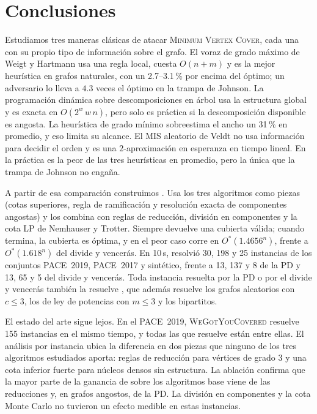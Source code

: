 \section{Conclusiones}\label{sec:conclusiones}

Estudiamos tres maneras clásicas de atacar \textsc{Minimum Vertex Cover}, cada una con su propio tipo de información sobre el grafo. El voraz de grado máximo de Weigt y Hartmann usa una regla local, cuesta $O(n+m)$ y es la mejor heurística en grafos naturales, con un 2.7--3.1\,\% por encima del óptimo; un adversario lo lleva a $4.3$ veces el óptimo en la trampa de Johnson. La programación dinámica sobre descomposiciones en árbol usa la estructura global y es exacta en $O(2^w\,w\,n)$, pero solo es práctica si la descomposición disponible es angosta. La heurística de grado mínimo sobreestima el ancho un 31\,\% en promedio, y eso limita su alcance. El MIS aleatorio de Veldt no usa información para decidir el orden y es una $2$-aproximación en esperanza en tiempo lineal. En la práctica es la peor de las tres heurísticas en promedio, pero la única que la trampa de Johnson no engaña.

A partir de esa comparación construimos \hyvc. Usa los tres algoritmos como piezas (cotas superiores, regla de ramificación y resolución exacta de componentes angostas) y los combina con reglas de reducción, división en componentes y la cota LP de Nemhauser y Trotter. Siempre devuelve una cubierta válida; cuando termina, la cubierta es óptima, y en el peor caso corre en $O^*(1.4656^n)$, frente a $O^*(1.618^n)$ del divide y vencerás. En 10\,s, \hyvc{} resolvió 30, 198 y 25 instancias de los conjuntos PACE~2019, PACE~2017 y sintético, frente a 13, 137 y 8 de la PD y 13, 65 y 5 del divide y vencerás. Toda instancia resuelta por la PD o por el divide y vencerás también la resuelve \hyvc, que además resuelve los grafos aleatorios con $c\le 3$, los de ley de potencias con $m\le 3$ y los bipartitos.

El estado del arte sigue lejos. En el PACE~2019, \textsc{WeGotYouCovered} resuelve 155 instancias en el mismo tiempo, y todas las que \hyvc{} resuelve están entre ellas. El análisis por instancia ubica la diferencia en dos piezas que ninguno de los tres algoritmos estudiados aporta: reglas de reducción para vértices de grado 3 y una cota inferior fuerte para núcleos densos sin estructura. La ablación confirma que la mayor parte de la ganancia de \hyvc{} sobre los algoritmos base viene de las reducciones y, en grafos angostos, de la PD. La división en componentes y la cota Monte Carlo no tuvieron un efecto medible en estas instancias.


